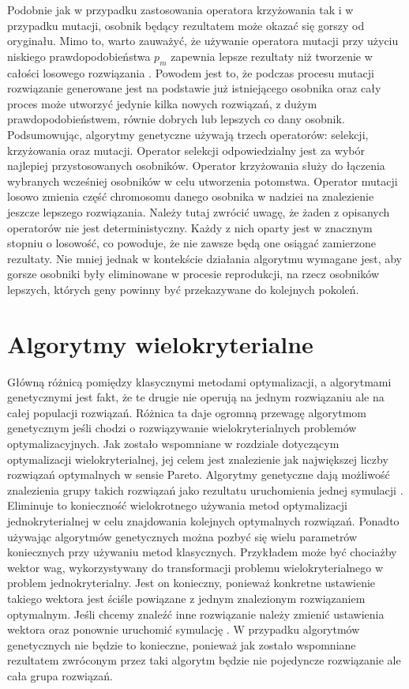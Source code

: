 \documentclass[twoside]{iisthesis}
\begin{document}
Podobnie jak w przypadku zastosowania operatora krzyżowania tak i w przypadku mutacji, osobnik będący rezultatem może okazać się gorszy od oryginału. Mimo to, warto zauważyć, że używanie operatora mutacji przy użyciu niskiego prawdopodobieństwa $p_{m}$ zapewnia lepsze rezultaty niż tworzenie w całości losowego rozwiązania \cite{book}. Powodem jest to, że podczas procesu mutacji rozwiązanie generowane jest na podstawie już istniejącego osobnika oraz cały proces może utworzyć jedynie kilka nowych rozwiązań, z dużym prawdopodobieństwem, równie dobrych lub lepszych co dany osobnik.\\

Podsumowując, algorytmy genetyczne używają trzech operatorów: selekcji, krzyżowania oraz mutacji. Operator selekcji odpowiedzialny jest za wybór najlepiej przystosowanych osobników. Operator krzyżowania służy do łączenia wybranych wcześniej osobników w celu utworzenia potomstwa. Operator mutacji losowo zmienia część chromosomu danego osobnika w nadziei na znalezienie jeszcze lepszego rozwiązania. Należy tutaj zwrócić uwagę, że żaden z opisanych operatorów nie jest deterministyczny. Każdy z nich oparty jest w znacznym stopniu o losowość, co powoduje, że nie zawsze będą one osiągać zamierzone rezultaty. Nie mniej jednak w kontekście działania algorytmu wymagane jest, aby gorsze osobniki były eliminowane w procesie reprodukcji, na rzecz osobników lepszych, których geny powinny być przekazywane do kolejnych pokoleń.
\section{Algorytmy wielokryterialne}
Główną różnicą pomiędzy klasycznymi metodami optymalizacji, a algorytmami genetycznymi jest fakt, że te drugie nie operują na jednym rozwiązaniu ale na całej populacji rozwiązań. Różnica ta daje ogromną przewagę algorytmom genetycznym jeśli chodzi o rozwiązywanie wielokryterialnych problemów optymalizacyjnych. Jak zostało wspomniane w rozdziale dotyczącym optymalizacji wielokryterialnej, jej celem jest znalezienie jak największej liczby rozwiązań optymalnych w sensie Pareto. Algorytmy genetyczne dają możliwość znalezienia grupy takich rozwiązań jako rezultatu uruchomienia jednej symulacji \cite{book}. Eliminuje to konieczność wielokrotnego używania metod optymalizacji jednokryterialnej w celu znajdowania kolejnych optymalnych rozwiązań. Ponadto używając algorytmów genetycznych można pozbyć się wielu parametrów koniecznych przy używaniu metod klasycznych. Przykładem może być chociażby wektor wag, wykorzystywany do transformacji problemu wielokryterialnego w problem jednokryterialny. Jest on konieczny, ponieważ konkretne ustawienie takiego wektora jest ściśle powiązane z jednym znalezionym rozwiązaniem optymalnym. Jeśli chcemy znaleźć inne rozwiązanie należy zmienić ustawienia wektora oraz ponownie uruchomić symulację \cite{book}. W przypadku algorytmów genetycznych nie będzie to konieczne, ponieważ jak zostało wspomniane rezultatem zwróconym przez taki algorytm będzie nie pojedyncze rozwiązanie ale cała grupa rozwiązań.
\end{document}
